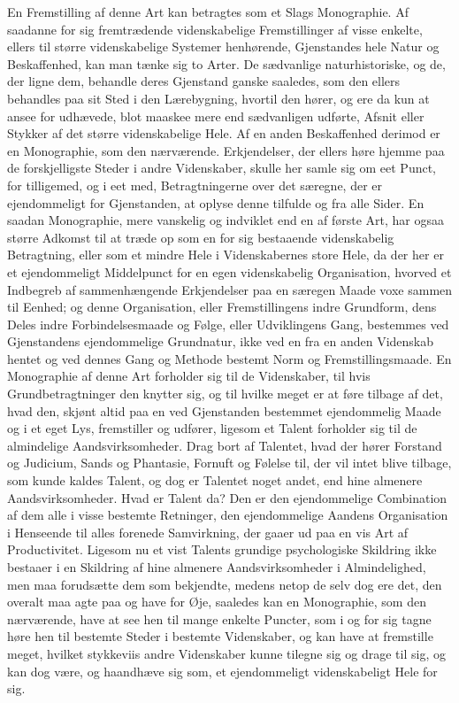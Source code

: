 \documentclass[12pt,a4paper]{book}
\newcommand{\opage}[1]{\marginnote{\footnotesize\textit{[#1]}}}
\begin{document}
En Fremstilling af denne Art kan betragtes som et Slags Monographie. Af
saadanne for sig fremtrædende videnskabelige Fremstillinger af visse enkelte,
ellers til større videnskabelige Systemer henhørende, Gjenstandes hele Natur
og Beskaffenhed, kan man tænke sig to Arter. De sædvanlige naturhistoriske,
og de, der ligne dem, behandle deres Gjenstand ganske saaledes, som den
ellers behandles paa sit Sted i den Lærebygning, hvortil den hører, og ere da
kun at ansee for udhævede, blot maaskee mere end sædvanligen udførte, Afsnit
eller Stykker af det større videnskabelige Hele. Af en anden Beskaffenhed
derimod er en Monographie, som den nærværende. Erkjendelser, der ellers høre
hjemme paa de forskjelligste Steder i andre Videnskaber, skulle \opage{VIII} her samle sig
om eet Punct, for tilligemed, og i eet med, Betragtningerne over det særegne,
der er ejendommeligt for Gjenstanden, at oplyse denne tilfulde og fra alle
Sider. En saadan Monographie, mere vanskelig og indviklet end en af første
Art, har ogsaa større Adkomst til at træde op som en for sig bestaaende
videnskabelig Betragtning, eller som et mindre Hele i Videnskabernes store
Hele, da der her er et ejendommeligt Middelpunct for en egen videnskabelig
Organisation, hvorved et Indbegreb af sammenhængende Erkjendelser paa en
særegen Maade voxe sammen til Eenhed; og denne Organisation, eller
Fremstillingens indre Grundform, dens Deles indre Forbindelsesmaade og Følge,
eller Udviklingens Gang, bestemmes ved Gjenstandens ejendommelige Grundnatur,
ikke ved en fra en anden Videnskab hentet og ved dennes Gang og Methode
bestemt Norm og Fremstillingsmaade. En Monographie af denne Art forholder sig
til de Videnskaber, til hvis Grundbetragtninger den knytter sig, og til
hvilke meget er at føre tilbage af det, hvad den, skjønt altid paa en ved
Gjenstanden bestemmet ejendommelig Maade \opage{IX} og i et eget Lys, fremstiller og
udfører, ligesom et Talent forholder sig til de almindelige
Aandsvirksomheder. Drag bort af Talentet, hvad der hører Forstand og
Judicium, Sands og Phantasie, Fornuft og Følelse til, der vil intet blive
tilbage, som kunde kaldes Talent, og dog er Talentet noget andet, end hine
almenere Aandsvirksomheder. Hvad er Talent da? Den er den ejendommelige
Combination af dem alle i visse bestemte Retninger, den ejendommelige Aandens
Organisation i Henseende til alles forenede Samvirkning, der gaaer ud paa en
vis Art af Productivitet. Ligesom nu et vist Talents grundige psychologiske
Skildring ikke bestaaer i en Skildring af hine almenere Aandsvirksomheder i
Almindelighed, men maa forudsætte dem som bekjendte, medens netop de selv dog
ere det, den overalt maa agte paa og have for Øje, saaledes kan en
Monographie, som den nærværende, have at see hen til mange enkelte Puncter,
som i og for sig tagne høre hen til bestemte Steder i bestemte Videnskaber,
og kan have at fremstille meget, hvilket stykkeviis andre Videnskaber kunne
tilegne sig og drage til sig, og kan \opage{X} dog være, og haandhæve sig som, et
ejendommeligt videnskabeligt Hele for sig.
\end{document}

